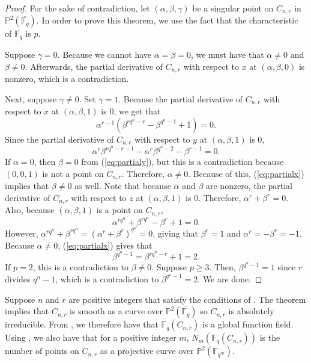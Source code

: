 \documentclass[12pt,letterpaper]{amsart}
\theoremstyle{definition}
\newcommand{\pref}[1]{(\ref{#1})}
\begin{document}
\begin{proof}
For the sake of contradiction, let $(\alpha,\beta,\gamma)$ be a singular point on $C_{n,r}$ in $\mathbb{P}^2(\overline{\mathbb{F}_q})$. In order to prove this theorem, we use the fact that the characteristic of $\overline{\mathbb{F}_q}$ is $p$.

Suppose $\gamma=0$. Because we cannot have $\alpha=\beta=0$, we must have that $\alpha\not=0$ and $\beta\not=0$. Afterwards, the partial derivative of $C_{n,r}$ with respect to $x$ at $(\alpha,\beta,0)$ is nonzero, which is a contradiction.

Next, suppose $\gamma\not=0$. Set $\gamma=1$. Because the partial derivative of $C_{n,r}$ with respect to $x$ at $(\alpha,\beta, 1)$ is $0$, we get that
\begin{equation}
\label{eq:partialx}
\alpha^{r-1}(\beta^{rq^n-r}-\beta^{q^n-1}+1)=0.
\end{equation}
Since the partial derivative of $C_{n,r}$ with respect to $y$ at $(\alpha,\beta,1)$ is $0$,
\begin{equation}
\label{eq:partialy}
\alpha^r\beta^{rq^n-r-1}-\alpha^r\beta^{q^n-2}-\beta^{r-1}=0.
\end{equation}
If $\alpha=0$, then $\beta=0$ from \pref{eq:partialy}, but this is a contradiction because $(0,0,1)$ is not a point on $C_{n,r}$. Therefore, $\alpha\not=0$. Because of this, \pref{eq:partialx} implies that $\beta\not=0$ as well. Note that because $\alpha$ and $\beta$ are nonzero, the partial derivative of $C_{n,r}$ with respect to $z$ at $(\alpha,\beta,1)$ is $0$. Therefore, $\alpha^r+\beta^r=0$. Also, because $(\alpha,\beta,1)$ is a point on $C_{n,r}$,
\[
\alpha^{rq^n}+\beta^{rq^n}-\beta^r+1=0.
\]
However, $\alpha^{rq^n}+\beta^{rq^n}=(\alpha^r+\beta^r)^{q^n}=0$, giving that $\beta^r=1$ and $\alpha^r=-\beta^r=-1$. Because $\alpha\not=0$, \pref{eq:partialx} gives that
\[
\beta^{q^n-1}=\beta^{rq^n-r}+1=2.
\]
If $p=2$, this is a contradiction to $\beta\not=0$. Suppose $p\geq 3$. Then, $\beta^{q^n-1}=1$ since $r$ divides $q^n-1$, which is a contradiction to $\beta^{q^n-1}=2$. We are done.
\end{proof}

Suppose $n$ and $r$ are positive integers that satisfy the conditions of . The theorem implies that $C_{n,r}$ is smooth as a curve over $\mathbb{P}^2(\overline{\mathbb{F}_q})$ so $C_{n,r}$ is absolutely irreducible. From \cite{AuerRCF}, we therefore have that $\mathbb{F}_q(C_{n,r})$ is a global function field. Using \cite{AuerRCF}, we also have that for a positive integer $m$, $N_m(\mathbb{F}_q(C_{n,r}))$ is the number of points on $C_{n,r}$ as a projective curve over $\mathbb{P}^2(\mathbb{F}_{q^m})$. 
\end{document}
